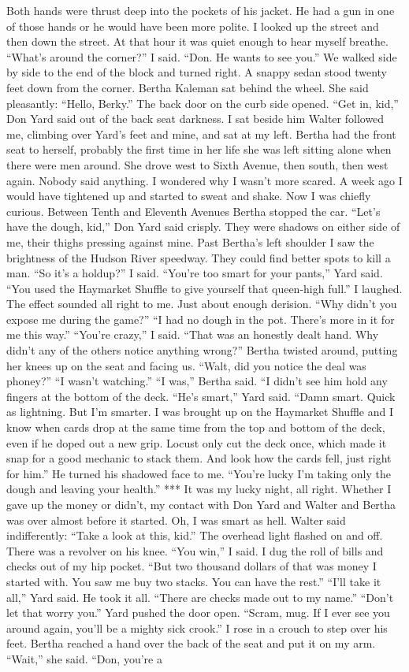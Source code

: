 \documentclass{novel}
\begin{document}
Both hands were thrust deep into the pockets of his jacket. He had a gun in one of those hands or he would have been more polite. I looked up the street and then down the street. At that hour it was quiet enough to hear myself breathe. “What’s around the corner?” I said. “Don. He wants to see you.” We walked side by side to the end of the block and turned right. A snappy sedan stood twenty feet down from the corner. Bertha Kaleman sat behind the wheel. She said pleasantly: “Hello, Berky.” The back door on the curb side opened. “Get in, kid,” Don Yard said out of the back seat darkness. I sat beside him Walter followed me, climbing over Yard’s feet and mine, and sat at my left. Bertha had the front seat to herself, probably the first time in her life she was left sitting alone when there were men around. She drove west to Sixth Avenue, then south, then west again. Nobody said anything. I wondered why I wasn’t more scared. A week ago I would have tightened up and started to sweat and shake. Now I was chiefly curious. Between Tenth and Eleventh Avenues Bertha stopped the car. “Let’s have the dough, kid,” Don Yard said crisply. They were shadows on either side of me, their thighs pressing against mine. Past Bertha’s left shoulder I saw the brightness of the Hudson River speedway. They could find better spots to kill a man. “So it’s a holdup?” I said. “You’re too smart for your pants,” Yard said. “You used the Haymarket Shuffle to give yourself that queen-high full.” I laughed. The effect sounded all right to me. Just about enough derision. “Why didn’t you expose me during the game?” “I had no dough in the pot. There’s more in it for me this way.” “You’re crazy,” I said. “That was an honestly dealt hand. Why didn’t any of the others notice anything wrong?” Bertha twisted around, putting her knees up on the seat and facing us. “Walt, did you notice the deal was phoney?” “I wasn’t watching.” “I was,” Bertha said. “I didn’t see him hold any fingers at the bottom of the deck. “He’s smart,” Yard said. “Damn smart. Quick as lightning. But I’m smarter. I was brought up on the Haymarket Shuffle and I know when cards drop at the same time from the top and bottom of the deck, even if he doped out a new grip. Locust only cut the deck once, which made it snap for a good mechanic to stack them. And look how the cards fell, just right for him.” He turned his shadowed face to me. “You’re lucky I’m taking only the dough and leaving your health.” *** It was my lucky night, all right. Whether I gave up the money or didn’t, my contact with Don Yard and Walter and Bertha was over almost before it started. Oh, I was smart as hell. Walter said indifferently: “Take a look at this, kid.” The overhead light flashed on and off. There was a revolver on his knee. “You win,” I said. I dug the roll of bills and checks out of my hip pocket. “But two thousand dollars of that was money I started with. You saw me buy two stacks. You can have the rest.” “I’ll take it all,” Yard said. He took it all. “There are checks made out to my name.” “Don’t let that worry you.” Yard pushed the door open. “Scram, mug. If I ever see you around again, you’ll be a mighty sick crook.” I rose in a crouch to step over his feet. Bertha reached a hand over the back of the seat and put it on my arm. “Wait,” she said. “Don, you’re a 
\end{document}
